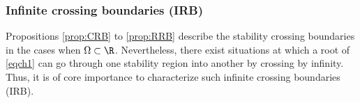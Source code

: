 \documentclass[twoside,reqno,11pt]{fcaa-var} %
\begin{document}
\subsubsection{Infinite crossing boundaries (IRB)}
Propositions \ref{prop:CRB} to \ref{prop:RRB} describe the stability crossing boundaries in the cases when $\Omega\subset\R$. Nevertheless, there exist situations at which a root of \eqref{eqch1} can go through one stability region into another by crossing by infinity. Thus, it is of core importance to characterize such infinite crossing boundaries (IRB). %
\end{document}
